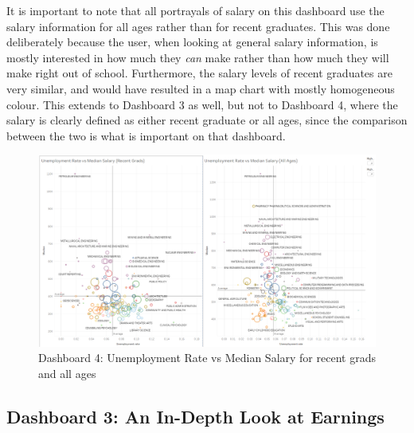 \documentclass[sigchi]{acmart}
\begin{document}
It is important to note that all portrayals of salary on this dashboard use the salary information for all ages rather than for recent graduates. This was done deliberately because the user, when looking at general salary information, is mostly interested in how much they \textit{can} make rather than how much they will make right out of school. Furthermore, the salary levels of recent graduates are very similar, and would have resulted in a map chart with mostly homogeneous colour. This extends to Dashboard 3 as well, but not to Dashboard 4, where the salary is clearly defined as either recent graduate or all ages, since the comparison between the two is what is important on that dashboard.

\begin{figure}[thpb]
  \includegraphics[width=1.0\textwidth]{DB4.png}
     \caption{Dashboard 4: Unemployment Rate vs Median Salary for recent grads and all ages}
         \label{fig:db4}
  \end{figure}
  
\subsection{Dashboard 3: An In-Depth Look at Earnings}
\label{sec:db3}
\end{document}

